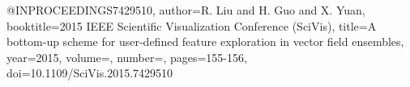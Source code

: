 @INPROCEEDINGS{7429510,
  author={R. {Liu} and H. {Guo} and X. {Yuan}},
  booktitle={2015 IEEE Scientific Visualization Conference (SciVis)}, 
  title={A bottom-up scheme for user-defined feature exploration in vector field ensembles}, 
  year={2015},
  volume={},
  number={},
  pages={155-156},
  doi={10.1109/SciVis.2015.7429510}}